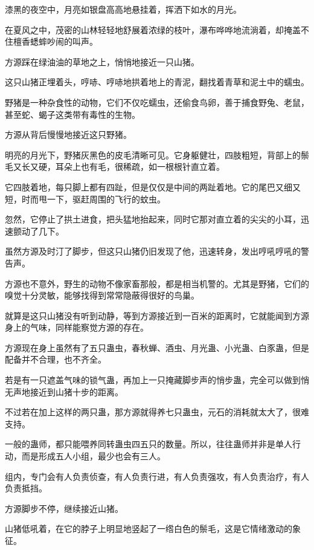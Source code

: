 
\begin{this_body}



漆黑的夜空中，月亮如银盘高高地悬挂着，挥洒下如水的月光。

在夏风之中，茂密的山林轻轻地舒展着浓绿的枝叶，瀑布哗哗地流淌着，却掩盖不住檀香蟋蟀吵闹的叫声。

方源踩在绿油油的草地之上，悄悄地接近一只山猪。

这只山猪正埋着头，哼哧、哼哧地拱着地上的青泥，翻找着青草和泥土中的蠕虫。

野猪是一种杂食性的动物，它们不仅吃蠕虫，还偷食鸟卵，善于捕食野兔、老鼠，甚至蛇、蝎子这类带有毒性的生物。

方源从背后慢慢地接近这只野猪。

明亮的月光下，野猪灰黑色的皮毛清晰可见。它身躯健壮，四肢粗短，背部上的鬃毛又长又硬，耳朵上也有毛，很稀疏，如一根根针直立着。

它四肢着地，每只脚上都有四趾，但是仅仅是中间的两趾着地。它的尾巴又细又短，时而甩一下，驱赶周围的飞行的蚊虫。

忽然，它停止了拱土进食，把头猛地抬起来，同时它那对直立着的尖尖的小耳，迅速颤动了几下。

虽然方源及时汀了脚步，但这只山猪仍旧发现了他，迅速转身，发出哼吼哼吼的警告声。

方源也不意外，野生的动物不像家畜那般，都是相当机警的。尤其是野猪，它们的嗅觉十分灵敏，能够找得到常常隐蔽得很好的鸟巢。

就算是这只山猪没有听到动静，等到方源接近到一百米的距离时，它就能闻到方源身上的气味，同样能察觉方源的存在。

方源现在身上虽然有了五只蛊虫，春秋蝉、酒虫、月光蛊、小光蛊、白豕蛊，但是配备并不合理，也不齐全。

若是有一只遮盖气味的锁气蛊，再加上一只掩藏脚步声的悄步蛊，完全可以做到悄无声地接近到山猪十步的距离。

不过若在加上这样的两只蛊，那方源就得养七只蛊虫，元石的消耗就太大了，很难支持。

一般的蛊师，都只能喂养同转蛊虫四五只的数量。所以，往往蛊师并非是单人行动，而是形成五人小组，最少也会有三人。

组内，专门会有人负责侦查，有人负责行进，有人负责强攻，有人负责治疗，有人负责抵挡。

方源脚步不停，继续接近山猪。

山猪低吼着，在它的脖子上明显地竖起了一绺白色的鬃毛，这是它情绪激动的象征。


\end{this_body}
